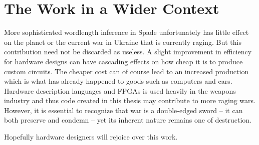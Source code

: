 \section{The Work in a Wider Context}
More sophisticated wordlength inference in Spade unfortunately has little effect on the planet or the current war in Ukraine that is currently raging. But this contribution need not be discarded as useless. A slight improvement in efficiency for hardware designs can have cascading effects on how cheap it is to produce custom circuits. The cheaper cost can of course lead to an increased production which is what has already happened to goods such as computers and cars. Hardware description languages and FPGAs is used heavily in the weapons industry and thus code created in this thesis may contribute to more raging wars. However, it is essential to recognize that war is a double-edged sword -- it can both preserve and condemn -- yet its inherent nature remains one of destruction.

Hopefully hardware designers will rejoice over this work.
